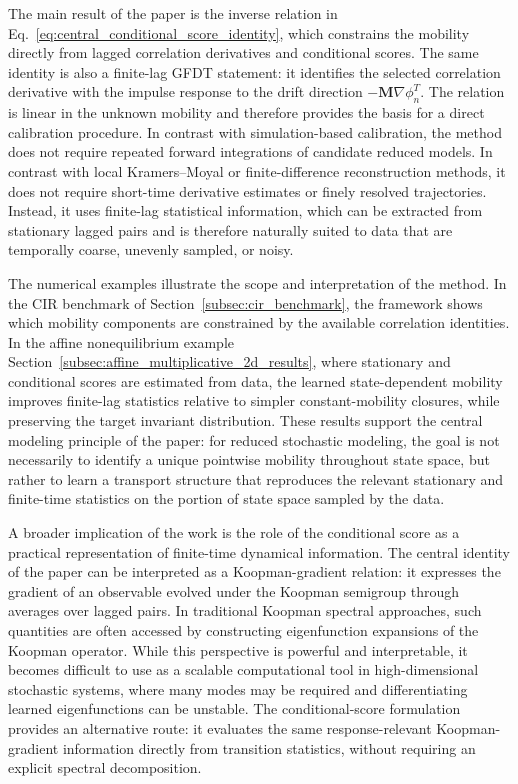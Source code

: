 \documentclass[11pt,twoside,fleqn]{article}
\begin{document}
The main result of the paper is the inverse relation in
Eq.~\eqref{eq:central_conditional_score_identity}, which constrains the mobility
directly from lagged correlation derivatives and conditional scores. The same
identity is also a finite-lag GFDT statement: it identifies the selected
correlation derivative with the impulse response to the drift direction
\(-\bm{M}\nabla\phi_n^T\). The relation is linear in the unknown mobility and
therefore provides the basis for a direct calibration procedure. In contrast
with simulation-based calibration,
the method does not require repeated forward integrations of candidate reduced
models. In contrast with local Kramers--Moyal or finite-difference
reconstruction methods, it does not require short-time derivative estimates or
finely resolved trajectories. Instead, it uses finite-lag statistical
information, which can be extracted from stationary lagged pairs and is
therefore naturally suited to data that are temporally coarse, unevenly sampled,
or noisy.

The numerical examples illustrate the scope and interpretation of the method.
In the CIR benchmark of
Section~\ref{subsec:cir_benchmark}, the framework shows which mobility components
are constrained by the available correlation identities.
In the affine nonequilibrium example
Section~\ref{subsec:affine_multiplicative_2d_results}, where stationary and
conditional scores are estimated from data, the learned state-dependent mobility
improves finite-lag statistics relative to simpler constant-mobility closures,
while preserving the target invariant distribution.
These results support the central modeling principle of the paper: for reduced
stochastic modeling, the goal is not necessarily to identify a unique pointwise
mobility throughout state space, but rather to learn a transport structure that
reproduces the relevant stationary and finite-time statistics on the portion of
state space sampled by the data.

A broader implication of the work is the role of the conditional score as a
practical representation of finite-time dynamical information. The central
identity of the paper can be interpreted as a Koopman-gradient relation: it
expresses the gradient of an observable evolved under the Koopman semigroup
through averages over lagged pairs. In traditional Koopman spectral approaches,
such quantities are often accessed by constructing eigenfunction expansions of
the Koopman operator. While this perspective is powerful and interpretable, it
becomes difficult to use as a scalable computational tool in high-dimensional
stochastic systems, where many modes may be required and differentiating learned
eigenfunctions can be unstable. The conditional-score formulation provides an
alternative route: it evaluates the same response-relevant Koopman-gradient
information directly from transition statistics, without requiring an explicit
spectral decomposition.
\end{document}
